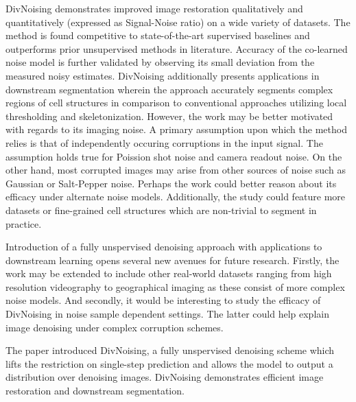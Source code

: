 \documentclass[11pt,letterpaper]{article}
\begin{document}
DivNoising demonstrates improved image restoration qualitatively and quantitatively (expressed as Signal-Noise ratio) on a wide variety of datasets. The method is found competitive to state-of-the-art supervised baselines and outperforms prior unsupervised methods in literature. Accuracy of the co-learned noise model is further validated by observing its small deviation from the measured noisy estimates. DivNoising additionally presents applications in downstream segmentation wherein the approach accurately segments complex regions of cell structures in comparison to conventional approaches utilizing local thresholding and skeletonization. However, the work may be better motivated with regards to its imaging noise. A primary assumption upon which the method relies is that of independently occuring corruptions in the input signal. The assumption holds true for Poission shot noise and camera readout noise. On the other hand, most corrupted images may arise from other sources of noise such as Gaussian or Salt-Pepper noise. Perhaps the work could better reason about its efficacy under alternate noise models. Additionally, the study could feature more datasets or fine-grained cell structures which are non-trivial to segment in practice. 

Introduction of a fully unspervised denoising approach with applications to downstream learning opens several new avenues for future research. Firstly, the work may be extended to include other real-world datasets ranging from high resolution videography to geographical imaging as these consist of more complex noise models. And secondly, it would be interesting to study the efficacy of DivNoising in noise sample dependent settings. The latter could help explain image denoising under complex corruption schemes. 

The paper introduced DivNoising, a fully unspervised denoising scheme which lifts the restriction on single-step prediction and allows the model to output a distribution over denoising images. DivNoising demonstrates efficient image restoration and downstream segmentation. 
\end{document}
